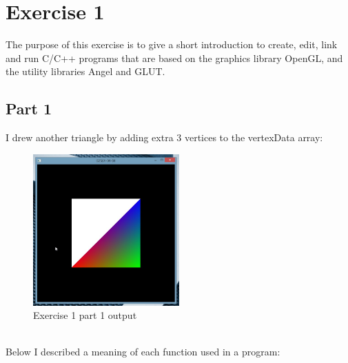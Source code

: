 \chapter{Exercise 1}
The purpose of this exercise is to give a short introduction to
create, edit, link and run C/C++ programs that are based on the
graphics library OpenGL, and the utility libraries Angel and
GLUT.
\section{Part 1}
I drew another triangle by adding extra 3 vertices to the vertexData array:
\begin{figure}[ht!]
	\begin{center}
		\includegraphics[width=0.5\textwidth]{figures/exercise_1_part_1}
	\end{center}
	\caption{Exercise 1 part 1 output}
\end{figure} \\
Below I described a meaning of each function used in a program:
